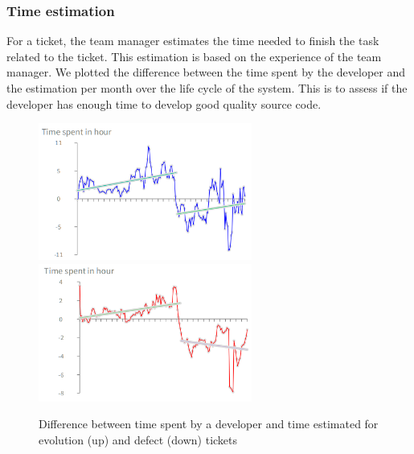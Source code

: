 \documentclass[10pt,conference]{IEEEtran}
\begin{document}
\subsubsection{Time estimation}

For a ticket, the team manager estimates the time needed to finish the task related to the ticket.
This estimation is based on the experience of the team manager.  
We plotted the difference  between the time spent by the developer and the estimation per month over the life cycle of the system.  
This is to assess if the developer has enough time to develop good quality source code.



\begin{figure}[htbp]
  \centering
  \includegraphics[width=70mm]{./images/estimateEvol.png}\\
  \includegraphics[width=70mm]{./images/estimateBug.png}
    \caption{Difference between time spent by a developer  and time estimated for  evolution (up) and defect (down) tickets}
  \label{fig:devEst}
\end{figure}
\end{document}
